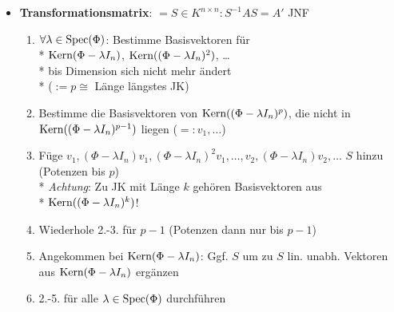 \begin{itemize}
  \item \textbf{Transformationsmatrix}: \( = S \in K^{n \times n} : S^{-1}AS = A' \) JNF
    \begin{enumerate}
      \item \( \forall \lambda \in \text{Spec}(\Phi) \): Bestimme Basisvektoren für 
        \\*
        \( \text{Kern}(\Phi - \lambda I_n) \), \( \text{Kern}((\Phi - \lambda I_n)^2) \), \dots
        \\*
        bis Dimension sich nicht mehr ändert \\* (\( := p \cong \) Länge längstes JK)
      \item Bestimme die Basisvektoren von \( \text{Kern}((\Phi - \lambda I_n)^p) \), die nicht in \( \text{Kern}((\Phi - \lambda I_n)^{p-1}) \) liegen (\( =: v_1, \dots \))
      \item Füge \( v_1, (\Phi - \lambda I_n)v_1, (\Phi-\lambda I_n)^2v_1, \dots, v_2, (\Phi - \lambda I_n)v_2, \dots \) \( S \) hinzu (Potenzen bis \( p \)) \\*
        \emph{Achtung}: Zu JK mit Länge \( k \) gehören Basisvektoren aus \\* \phantom{x} \( \text{Kern}((\Phi - \lambda I_n)^k) \)!
      \item Wiederhole 2.-3. für \( p-1 \) (Potenzen dann nur bis \( p-1 \))
      \item Angekommen bei \( \text{Kern}(\Phi - \lambda I_n) \): Ggf. \( S \) um zu \( S \) lin. unabh. Vektoren aus \( \text{Kern}(\Phi - \lambda I_n) \) ergänzen
      \item 2.-5. für alle \( \lambda \in \text{Spec}(\Phi) \) durchführen
    \end{enumerate}
\end{itemize}